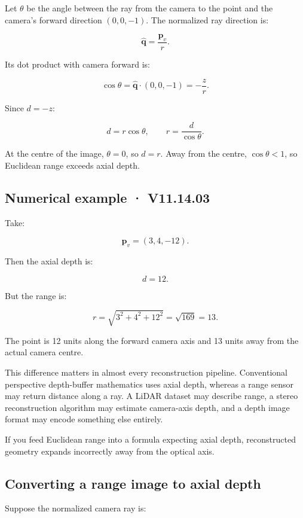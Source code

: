 Let \(\theta\) be the angle between the ray from the camera to the point and the camera's forward direction \((0,0,-1)\). The normalized ray direction is:

\[ \hat{\mathbf q}=\frac{\mathbf p_v}{r}. \]

Its dot product with camera forward is:

\[ \cos\theta = \hat{\mathbf q}\cdot(0,0,-1) = -\frac zr. \]

Since \(d=-z\):

\[ \boxed{d=r\cos\theta}, \qquad \boxed{r=\frac d{\cos\theta}}. \]

At the centre of the image, \(\theta=0\), so \(d=r\). Away from the centre, \(\cos\theta<1\), so Euclidean range exceeds axial depth.

\subsection{Numerical example · V11.14.03}\label{02-foundations-ii-ch035-numerical-example-v11.14.03}

Take:

\[ \mathbf p_v=(3,4,-12). \]

Then the axial depth is:

\[ \boxed{d=12}. \]

But the range is:

\[ r=\sqrt{3^2+4^2+12^2} =\sqrt{169} =\boxed{13}. \]

The point is 12 units along the forward camera axis and 13 units away from the actual camera centre.

This difference matters in almost every reconstruction pipeline. Conventional perspective depth-buffer mathematics uses axial depth, whereas a range sensor may return distance along a ray. A LiDAR dataset may describe range, a stereo reconstruction algorithm may estimate camera-axis depth, and a depth image format may encode something else entirely.

If you feed Euclidean range into a formula expecting axial depth, reconstructed geometry expands incorrectly away from the optical axis.

\subsection{Converting a range image to axial depth}\label{02-foundations-ii-ch035-converting-a-range-image-to-axial-depth}

Suppose the normalized camera ray is:

